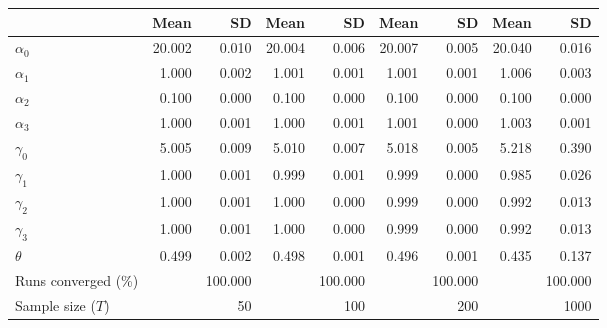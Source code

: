 
\begin{tabular}[t]{lrrrrrrrr}
\toprule
  & Mean & SD & Mean  & SD  & Mean   & SD   & Mean    & SD   \\
\midrule
$\alpha_{0}$ & 20.002 & 0.010 & 20.004 & 0.006 & 20.007 & 0.005 & 20.040 & 0.016\\
$\alpha_{1}$ & 1.000 & 0.002 & 1.001 & 0.001 & 1.001 & 0.001 & 1.006 & 0.003\\
$\alpha_{2}$ & 0.100 & 0.000 & 0.100 & 0.000 & 0.100 & 0.000 & 0.100 & 0.000\\
$\alpha_{3}$ & 1.000 & 0.001 & 1.000 & 0.001 & 1.001 & 0.000 & 1.003 & 0.001\\
$\gamma_{0}$ & 5.005 & 0.009 & 5.010 & 0.007 & 5.018 & 0.005 & 5.218 & 0.390\\
$\gamma_{1}$ & 1.000 & 0.001 & 0.999 & 0.001 & 0.999 & 0.000 & 0.985 & 0.026\\
$\gamma_{2}$ & 1.000 & 0.001 & 1.000 & 0.000 & 0.999 & 0.000 & 0.992 & 0.013\\
$\gamma_{3}$ & 1.000 & 0.001 & 1.000 & 0.000 & 0.999 & 0.000 & 0.992 & 0.013\\
$\theta$ & 0.499 & 0.002 & 0.498 & 0.001 & 0.496 & 0.001 & 0.435 & 0.137\\
Runs converged (\%) &  & 100.000 &  & 100.000 &  & 100.000 &  & 100.000\\
Sample size ($T$) &  & 50 &  & 100 &  & 200 &  & 1000\\
\bottomrule
\end{tabular}
